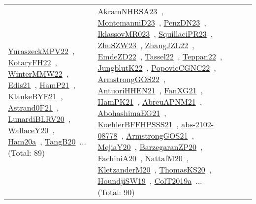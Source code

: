 {\begin{longtable}{lp{3cm}>{\raggedright\arraybackslash}p{6cm}>{\raggedright\arraybackslash}p{6cm}>{\raggedright\arraybackslash}p{8cm}}
\href{../works/YuraszeckMPV22.pdf}{YuraszeckMPV22}~\cite{YuraszeckMPV22}, \href{../works/KotaryFH22.pdf}{KotaryFH22}~\cite{KotaryFH22}, \href{../works/WinterMMW22.pdf}{WinterMMW22}~\cite{WinterMMW22}, \href{../works/Edis21.pdf}{Edis21}~\cite{Edis21}, \href{../works/HamP21.pdf}{HamP21}~\cite{HamP21}, \href{../works/KlankeBYE21.pdf}{KlankeBYE21}~\cite{KlankeBYE21}, \href{../works/Astrand0F21.pdf}{Astrand0F21}~\cite{Astrand0F21}, \href{../works/LunardiBLRV20.pdf}{LunardiBLRV20}~\cite{LunardiBLRV20}, \href{../works/WallaceY20.pdf}{WallaceY20}~\cite{WallaceY20}, \href{../works/Ham20a.pdf}{Ham20a}~\cite{Ham20a}, \href{../works/TangB20.pdf}{TangB20}~\cite{TangB20}... (Total: 89) & \href{../works/AkramNHRSA23.pdf}{AkramNHRSA23}~\cite{AkramNHRSA23}, \href{../works/MontemanniD23.pdf}{MontemanniD23}~\cite{MontemanniD23}, \href{../works/PenzDN23.pdf}{PenzDN23}~\cite{PenzDN23}, \href{../works/IklassovMR023.pdf}{IklassovMR023}~\cite{IklassovMR023}, \href{../works/SquillaciPR23.pdf}{SquillaciPR23}~\cite{SquillaciPR23}, \href{../works/ZhuSZW23.pdf}{ZhuSZW23}~\cite{ZhuSZW23}, \href{../works/ZhangJZL22.pdf}{ZhangJZL22}~\cite{ZhangJZL22}, \href{../works/EmdeZD22.pdf}{EmdeZD22}~\cite{EmdeZD22}, \href{../works/Tassel22.pdf}{Tassel22}~\cite{Tassel22}, \href{../works/Teppan22.pdf}{Teppan22}~\cite{Teppan22}, \href{../works/JungblutK22.pdf}{JungblutK22}~\cite{JungblutK22}, \href{../works/PopovicCGNC22.pdf}{PopovicCGNC22}~\cite{PopovicCGNC22}, \href{../works/ArmstrongGOS22.pdf}{ArmstrongGOS22}~\cite{ArmstrongGOS22}, \href{../works/AntuoriHHEN21.pdf}{AntuoriHHEN21}~\cite{AntuoriHHEN21}, \href{../works/FanXG21.pdf}{FanXG21}~\cite{FanXG21}, \href{../works/HamPK21.pdf}{HamPK21}~\cite{HamPK21}, \href{../works/AbreuAPNM21.pdf}{AbreuAPNM21}~\cite{AbreuAPNM21}, \href{../works/AbohashimaEG21.pdf}{AbohashimaEG21}~\cite{AbohashimaEG21}, \href{../works/KoehlerBFFHPSSS21.pdf}{KoehlerBFFHPSSS21}~\cite{KoehlerBFFHPSSS21}, \href{../works/abs-2102-08778.pdf}{abs-2102-08778}~\cite{abs-2102-08778}, \href{../works/ArmstrongGOS21.pdf}{ArmstrongGOS21}~\cite{ArmstrongGOS21}, \href{../works/MejiaY20.pdf}{MejiaY20}~\cite{MejiaY20}, \href{../works/BarzegaranZP20.pdf}{BarzegaranZP20}~\cite{BarzegaranZP20}, \href{../works/FachiniA20.pdf}{FachiniA20}~\cite{FachiniA20}, \href{../works/NattafM20.pdf}{NattafM20}~\cite{NattafM20}, \href{../works/KletzanderM20.pdf}{KletzanderM20}~\cite{KletzanderM20}, \href{../works/ThomasKS20.pdf}{ThomasKS20}~\cite{ThomasKS20}, \href{../works/HoundjiSW19.pdf}{HoundjiSW19}~\cite{HoundjiSW19}, \href{../works/ColT2019a.pdf}{ColT2019a}~\cite{ColT2019a}... (Total: 90)\\

\end{longtable}}
